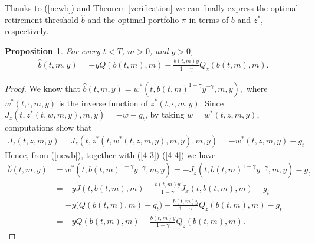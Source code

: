 \documentclass[a4paper,11pt]{amsart}
\numberwithin{equation}{section}
\newtheorem{pro}{Proposition}[section]
\newcommand{\blue}[1]{{\color{black}#1}}
\begin{document}
{




Thanks to (\ref{newb}) and Theorem \ref{verification} we can finally express the optimal retirement threshold $\widehat{b}$ and the optimal portfolio $\pi$ in terms of $b$ and $z^\ast$, respectively.


\begin{pro}\label{integralprimal}
  \blue{For every $t<T$, $m>0$, and $y>0$,}
  \begin{align}\label{bhat}
  	\widehat{b}(t,m,y)=- y Q(b(t,m),m)-\frac{b(t,m)y}{1-\gamma} Q_z(b(t,m),m).  
  	\end{align}
\end{pro}
\begin{proof}
We know that $\widehat{b}(t,m,y)= w^\ast(t,b(t,m)^{1-\gamma}y^{-\gamma},m,y),$ where $w^\ast(t, \cdot, m,y)$ is the inverse function of $z^\ast(t, \cdot, m,y).$ Since $J_z(t, z^\ast(t,w,m,y),m,y) =-w-g_t$, by taking $w =w^\ast(t,z,m,y)$, computations show that
\begin{align*}
J_z(t,z,m,y) =  J_z(t,z^\ast(t,w^\ast(t,z,m,y),m,y),m,y) = -w^\ast(t,z,m,y)-g_t.
\end{align*}
Hence, from (\ref{newb}), together with (\ref{4-3})-(\ref{4-4}) we have 
\begin{align*}
\widehat{b}(t,m,y) &=w^\ast(t,b(t,m)^{1-\gamma}y^{-\gamma},m,y)= -  J_z(t,b(t,m)^{1-\gamma}y^{-\gamma},m,y)-g_t \\
&= -y\widetilde{J}(t,b(t,m),m)- \frac{b(t,m)y}{1-\gamma}\widetilde{J}_x(t,b(t,m),m)-g_t \\
&=     -y\Big(Q(b(t,m),m)-q_t\Big)-\frac{b(t,m)y}{1-\gamma}Q_z(b(t,m),m)-g_t \\
&= - y Q(b(t,m),m)-\frac{b(t,m)y}{1-\gamma}Q_z(b(t,m),m).
\end{align*}


\end{proof}}
\end{document}

